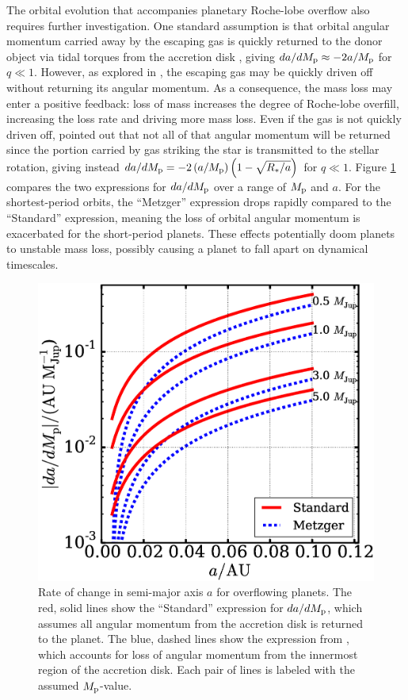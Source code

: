 \documentclass{aastex}
\begin{document}
The orbital evolution that accompanies planetary Roche-lobe overflow also requires further investigation. One standard assumption is that orbital angular momentum carried away by the escaping gas is quickly returned to the donor object via tidal torques from the accretion disk \citep[e.g.][]{2016arXiv160300392J}, giving $da/dM_{\rm p} \approx -2 a / M_{\rm p}$ for $q \ll 1$. However, as explored in \citet{2015ApJ...813..101V}, the escaping gas may be quickly driven off without returning its angular momentum. As a consequence, the mass loss may enter a positive feedback: loss of mass increases the degree of Roche-lobe overfill, increasing the loss rate and driving more mass loss. Even if the gas is not quickly driven off, \citet{2012MNRAS.425.2778M} pointed out that not all of that angular momentum will be returned since the portion carried by gas striking the star is transmitted to the stellar rotation, giving instead $da/dM_{\rm p} = -2 \left( a / M_{\rm p} \right) \left( 1 - \sqrt{R_*/a} \right)$ for $q \ll 1$. Figure \ref{fig:dadMp_vs_a} compares the two expressions for $da/dM_{\rm p}$ over a range of $M_{\rm p}$ and $a$. For the shortest-period orbits, the ``Metzger'' expression drops rapidly compared to the ``Standard'' expression, meaning the loss of orbital angular momentum is exacerbated for the short-period planets. These effects potentially doom planets to unstable mass loss, possibly causing a planet to fall apart on dynamical timescales. 

\begin{figure}
\includegraphics[width=\textwidth]{dadMp_vs_a}
\caption{Rate of change in semi-major axis $a$ for overflowing planets. The red, solid lines show the ``Standard'' expression for $da/dM_{\rm p}$, which assumes all angular momentum from the accretion disk is returned to the planet. The blue, dashed lines show the expression from \citet{2012MNRAS.425.2778M}, which accounts for loss of angular momentum from the innermost region of the accretion disk. Each pair of lines is labeled with the assumed $M_{\rm p}$-value.}
\label{fig:dadMp_vs_a}
\end{figure}
\end{document}

